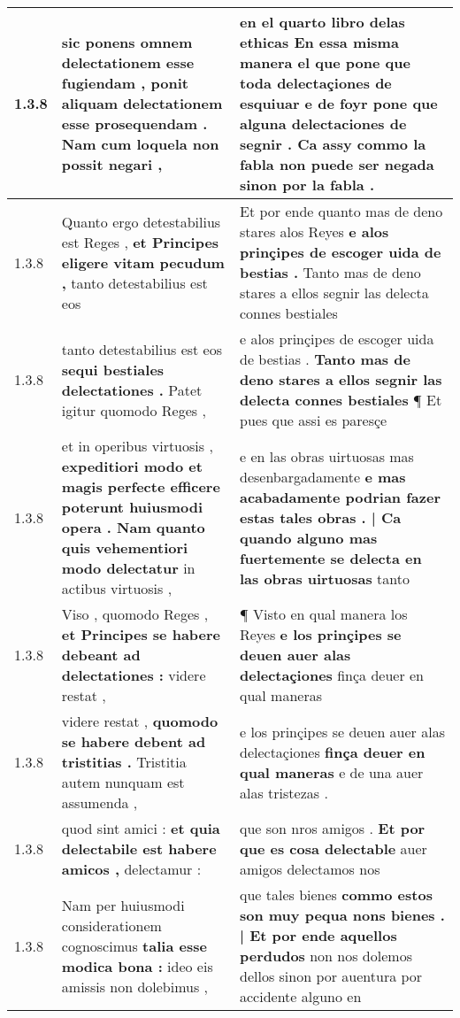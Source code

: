 \begin{tabular}{|p{1cm}|p{6.5cm}|p{6.5cm}|}
1.3.8 & sic ponens omnem delectationem esse fugiendam , \textbf{ ponit aliquam delectationem esse prosequendam . } Nam cum loquela non possit negari , & en el quarto libro delas ethicas \textbf{ En essa misma manera el que pone que toda delectaçiones de esquiuar e de foyr pone que alguna delectaciones de segnir . } Ca assy commo la fabla non puede ser negada sinon por la fabla . \\\hline
1.3.8 & Quanto ergo detestabilius est Reges , \textbf{ et Principes eligere vitam pecudum , } tanto detestabilius est eos & Et por ende quanto mas de deno stares alos Reyes \textbf{ e alos prinçipes de escoger uida de bestias . } Tanto mas de deno stares a ellos segnir las delecta connes bestiales \\\hline
1.3.8 & tanto detestabilius est eos \textbf{ sequi bestiales delectationes . } Patet igitur quomodo Reges , & e alos prinçipes de escoger uida de bestias . \textbf{ Tanto mas de deno stares a ellos segnir las delecta connes bestiales } ¶ Et pues que assi es paresçe \\\hline
1.3.8 & et in operibus virtuosis , \textbf{ expeditiori modo et magis perfecte efficere poterunt huiusmodi opera . Nam quanto quis vehementiori modo delectatur } in actibus virtuosis , & e en las obras uirtuosas mas desenbargadamente \textbf{ e mas acabadamente podrian fazer estas tales obras . | Ca quando alguno mas fuertemente se delecta en las obras uirtuosas } tanto \\\hline
1.3.8 & Viso , quomodo Reges , \textbf{ et Principes se habere debeant ad delectationes : } videre restat , & ¶ Visto en qual manera los Reyes \textbf{ e los prinçipes se deuen auer alas delectaçiones } finça deuer en qual maneras \\\hline
1.3.8 & videre restat , \textbf{ quomodo se habere debent ad tristitias . } Tristitia autem nunquam est assumenda , & e los prinçipes se deuen auer alas delectaçiones \textbf{ finça deuer en qual maneras } e de una auer alas tristezas . \\\hline
1.3.8 & quod sint amici : \textbf{ et quia delectabile est habere amicos , } delectamur : & que son nros amigos . \textbf{ Et por que es cosa delectable } auer amigos delectamos nos \\\hline
1.3.8 & Nam per huiusmodi considerationem cognoscimus \textbf{ talia esse modica bona : } ideo eis amissis non dolebimus , & que tales bienes \textbf{ commo estos son muy pequa nons bienes . | Et por ende aquellos perdudos } non nos dolemos dellos sinon por auentura por accidente alguno en \\\hline

\end{tabular}
